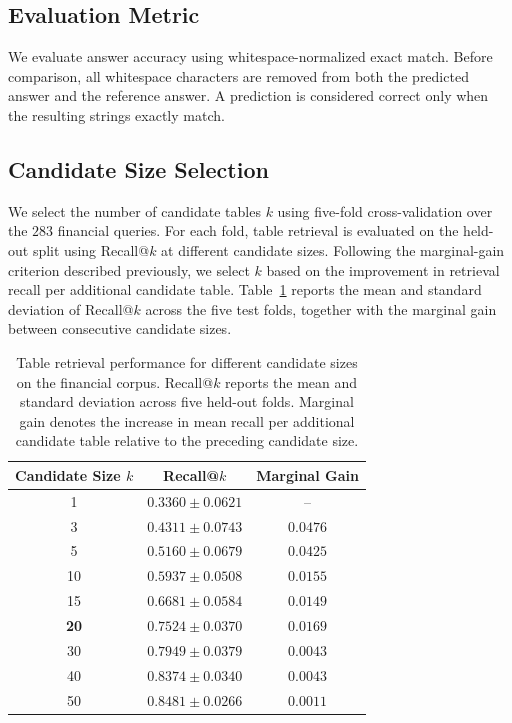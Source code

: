 \subsection{Evaluation Metric}
We evaluate answer accuracy using whitespace-normalized exact match.
Before comparison, all whitespace characters are removed from both the predicted answer and the reference answer.
A prediction is considered correct only when the resulting strings exactly match.

\subsection{Candidate Size Selection}

We select the number of candidate tables $k$ using five-fold cross-validation over the $283$ financial queries.
For each fold, table retrieval is evaluated on the held-out split using Recall@$k$ at different candidate sizes.
Following the marginal-gain criterion described previously, we select $k$ based on the improvement in retrieval recall per additional candidate table.
Table~\ref{tab:cmoney_candidate_selection} reports the mean and standard deviation of Recall@$k$ across the five test folds, together with the marginal gain between consecutive candidate sizes.

\begin{table}[t]
\centering
\small
\begin{tabular}{ccc}
\hline
\textbf{Candidate Size $k$} &
\textbf{Recall@$k$} &
\textbf{Marginal Gain} \\
\hline
1  & $0.3360 \pm 0.0621$ & -- \\
3  & $0.4311 \pm 0.0743$ & $0.0476$ \\
5  & $0.5160 \pm 0.0679$ & $0.0425$ \\
10 & $0.5937 \pm 0.0508$ & $0.0155$ \\
15 & $0.6681 \pm 0.0584$ & $0.0149$ \\
\textbf{20} & $\mathbf{0.7524 \pm 0.0370}$ & $\mathbf{0.0169}$ \\
30 & $0.7949 \pm 0.0379$ & $0.0043$ \\
40 & $0.8374 \pm 0.0340$ & $0.0043$ \\
50 & $0.8481 \pm 0.0266$ & $0.0011$ \\
\hline
\end{tabular}
\caption{Table retrieval performance for different candidate sizes on the financial corpus. Recall@$k$ reports the mean and standard deviation across five held-out folds. Marginal gain denotes the increase in mean recall per additional candidate table relative to the preceding candidate size.}
\label{tab:cmoney_candidate_selection}
\end{table}

